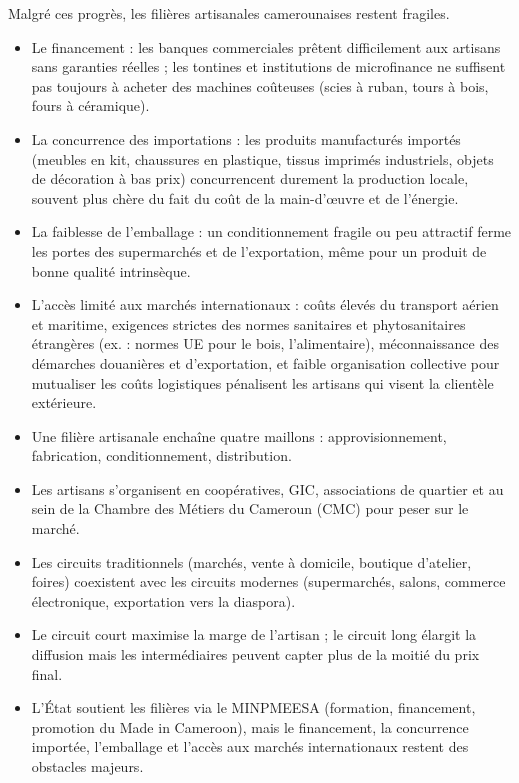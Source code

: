 \documentclass[11pt]{article}
\newcommand{\cle}[1]{{\popxbold\color{popdark}#1}}
\newcounter{popsec}
\newcounter{popsub}
\newcommand{\courssub}[1]{%
  \stepcounter{popsub}%
  \par\vspace{9pt}\noindent{\popxbold\fontsize{11.5}{13}\selectfont\color{popink}{\color{poporange}\thepopsec.\thepopsub}\hspace{6pt}#1}\par\nopagebreak\vspace{4pt}
}
\begin{document}
\courssub{Les difficultés persistantes}

Malgré ces progrès, les filières artisanales camerounaises restent fragiles.

\begin{itemize}
\item Le \cle{financement} : les banques commerciales prêtent difficilement aux artisans sans garanties réelles ; les tontines et institutions de microfinance ne suffisent pas toujours à acheter des machines coûteuses (scies à ruban, tours à bois, fours à céramique).
\item La \cle{concurrence des importations} : les produits manufacturés importés (meubles en kit, chaussures en plastique, tissus imprimés industriels, objets de décoration à bas prix) concurrencent durement la production locale, souvent plus chère du fait du coût de la main-d'œuvre et de l'énergie.
\item La \cle{faiblesse de l'emballage} : un conditionnement fragile ou peu attractif ferme les portes des supermarchés et de l'exportation, même pour un produit de bonne qualité intrinsèque.
\item L'\cle{accès limité aux marchés internationaux} : coûts élevés du transport aérien et maritime, exigences strictes des normes sanitaires et phytosanitaires étrangères (ex. : normes \textsc{UE} pour le bois, l'alimentaire), méconnaissance des démarches douanières et d'exportation, et faible organisation collective pour mutualiser les coûts logistiques pénalisent les artisans qui visent la clientèle extérieure.
\end{itemize}

\begin{aretenir}
\begin{itemize}
\item Une filière artisanale enchaîne quatre maillons : approvisionnement, fabrication, conditionnement, distribution.
\item Les artisans s'organisent en coopératives, GIC, associations de quartier et au sein de la Chambre des Métiers du Cameroun (CMC) pour peser sur le marché.
\item Les circuits traditionnels (marchés, vente à domicile, boutique d'atelier, foires) coexistent avec les circuits modernes (supermarchés, salons, commerce électronique, exportation vers la diaspora).
\item Le circuit court maximise la marge de l'artisan ; le circuit long élargit la diffusion mais les intermédiaires peuvent capter plus de la moitié du prix final.
\item L'État soutient les filières via le MINPMEESA (formation, financement, promotion du Made in Cameroon), mais le financement, la concurrence importée, l'emballage et l'accès aux marchés internationaux restent des obstacles majeurs.
\end{itemize}
\end{aretenir}
\end{document}
